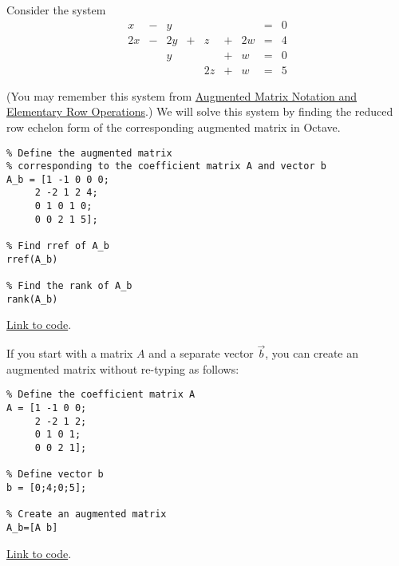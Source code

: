 \documentclass{ximera}
\begin{document}
\begin{template}\label{temp:rref}
Consider the system
\begin{equation}
\begin{array}{ccccccccc}
      x &- &y&&&&&= &0 \\
	 2x& -&2y&+&z&+&2w&=&4\\
     & &y&&&+&w&=&0\\
     & &&&2z&+&w&=&5
    \end{array}
    \end{equation}

 (You may remember this system from \href{https://ximera.osu.edu/linearalgebrav3/LinearAlgebraInteractiveIntro/SYS-0020/main}{Augmented Matrix Notation and Elementary Row Operations}.)  We will solve this system by finding the reduced row echelon form of the corresponding augmented matrix in Octave.  
    \begin{verbatim}
% Define the augmented matrix 
% corresponding to the coefficient matrix A and vector b
A_b = [1 -1 0 0 0;
     2 -2 1 2 4;
     0 1 0 1 0;
     0 0 2 1 5];
     
% Find rref of A_b
rref(A_b)

% Find the rank of A_b
rank(A_b)
    \end{verbatim}

\href{https://sagecell.sagemath.org/?z=eJxFjsEKwjAMhu-FvsN_Gehh0A49iYfB8CVEpOvSWWSt1Co-vumkmBCS_-cjSYOBnA-EfCOY17xQyDRhMTn5D2xMiZ6PGCYfZuS4UjaSc956JivXw4QJb7I5JoxS9NcRR5w1Wg1V8iAFSnRoO2huu-oo6F_9DYXC7C_VkaLByfMBfsYhOvB6KYrY8LSVgoUJ91V8ASwdNw8=&lang=octave&interacts=eJyLjgUAARUAuQ==}{Link to code}.    

    If you start with a matrix $A$ and a separate vector $\vec{b}$, you can create an augmented matrix without re-typing as follows:
    \begin{verbatim}
% Define the coefficient matrix A
A = [1 -1 0 0;
     2 -2 1 2;
     0 1 0 1;
     0 0 2 1];

% Define vector b
b = [0;4;0;5];

% Create an augmented matrix
A_b=[A b]
    \end{verbatim}

\href{https://sagecell.sagemath.org/?z=eJxFjrEKAyEQRHvBf5jmyoNVkkqukOQvjiOoWROL80BMyOdHIZLtHjvMvAlXjikz6pMRDo4xhcS5Yne1pA-sFBYLVoVZgUBGCvTTmDUU9GBCf6s_UouorbEU09h4c6hHgZfC904yJ0PmPEKXwq4yXIZ7PfbmwPefRXO4-WW18NsXtMsrmQ==&lang=octave&interacts=eJyLjgUAARUAuQ==}{Link to code}.

\end{template}
\end{document}
